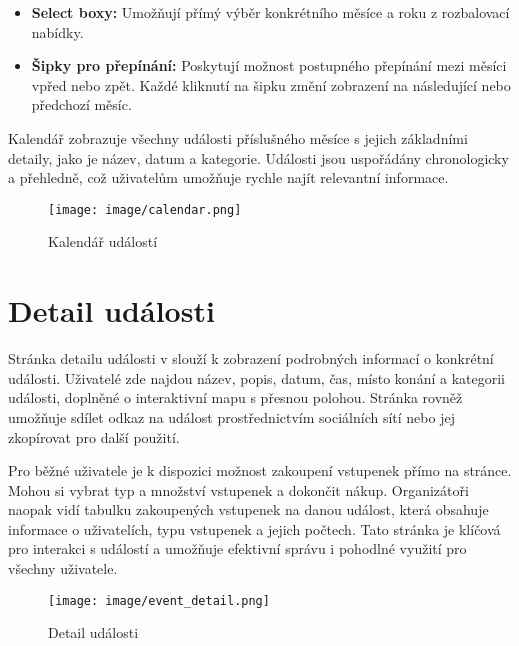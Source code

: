 \documentclass[12pt, a4paper,
twoside,        %
openright
]{report}
\begin{document}
	\begin{itemize}
		\item \textbf{Select boxy:} Umožňují přímý výběr konkrétního měsíce a roku z rozbalovací nabídky.
		\item \textbf{Šipky pro přepínání:} Poskytují možnost postupného přepínání mezi měsíci vpřed nebo zpět. Každé kliknutí na šipku změní zobrazení na následující nebo předchozí měsíc.
	\end{itemize}
	
	Kalendář zobrazuje všechny události příslušného měsíce s jejich základními detaily, jako je název, datum a kategorie. Události jsou uspořádány chronologicky a přehledně, což uživatelům umožňuje rychle najít relevantní informace.
	
	\begin{figure}[h!]
		\centering %
		\texttt{[image: image/calendar.png]} %
		\caption{Kalendář událostí} %
		\label{fig:caneldar} %
	\end{figure}
	
	\section{Detail události}
	
	Stránka detailu události v slouží k zobrazení podrobných informací o konkrétní události. Uživatelé zde najdou název, popis, datum, čas, místo konání a kategorii události, doplněné o interaktivní mapu s přesnou polohou. Stránka rovněž umožňuje sdílet odkaz na událost prostřednictvím sociálních sítí nebo jej zkopírovat pro další použití.
	
	Pro běžné uživatele je k dispozici možnost zakoupení vstupenek přímo na stránce. Mohou si vybrat typ a množství vstupenek a dokončit nákup. Organizátoři naopak vidí tabulku zakoupených vstupenek na danou událost, která obsahuje informace o uživatelích, typu vstupenek \linebreak a jejich počtech. Tato stránka je klíčová pro interakci s událostí a umožňuje efektivní správu \linebreak i pohodlné využití pro všechny uživatele.
	
	\begin{figure}[h!]
		\centering %
		\texttt{[image: image/event\_detail.png]} %
		\caption{Detail události} %
		\label{fig:eventdetail} %
	\end{figure}
	
\end{document}
